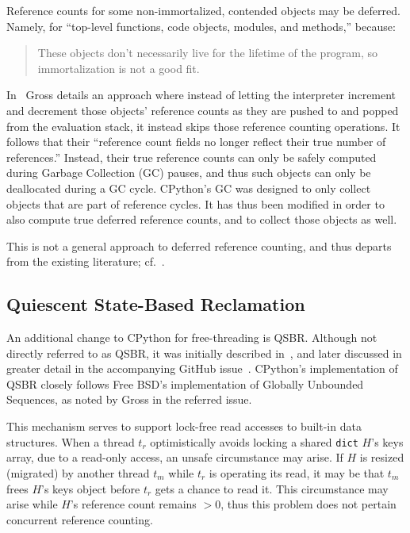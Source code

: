 Reference counts for some non-immortalized, contended objects may be deferred.
Namely, for ``top-level functions, code objects, modules, and methods,'' because:
\begin{quote}
    These objects don't necessarily live for the lifetime of the program, so immortalization is not a good fit.
\end{quote}

In~\cite[\S Deferred Reference Counting]{pep703} Gross details an approach where instead of letting the interpreter increment and decrement those objects' reference counts as they are pushed to and popped from the evaluation stack, it instead skips those reference counting operations.
It follows that their ``reference count fields no longer reflect their true number of references.''
Instead, their true reference counts can only be safely computed during Garbage Collection (GC) pauses, and thus such objects can only be deallocated during a GC cycle.
CPython's GC was designed to only collect objects that are part of reference cycles.
It has thus been modified in order to also compute true deferred reference counts, and to collect those objects as well.

This is not a general approach to deferred reference counting, and thus departs from the existing literature; cf.~\cite{deferred-refcounting}.


\subsection{Quiescent State-Based Reclamation}\label{subsec:qsbr}

An additional change to CPython for free-threading is QSBR\@.
Although not directly referred to as QSBR, it was initially described in~\cite[\S Mimalloc Page Reuse]{pep703}, and later discussed in greater detail in the accompanying GitHub issue~\cite{qsbr}.
CPython's implementation of QSBR closely follows Free BSD's implementation of Globally Unbounded Sequences, as noted by Gross in the referred issue.

This mechanism serves to support lock-free read accesses to built-in data structures.
When a thread $t_r$ optimistically avoids locking a shared \texttt{dict} $H$'s keys array, due to a read-only access, an unsafe circumstance may arise.
If $H$ is resized (migrated) by another thread $t_m$ while $t_r$ is operating its read, it may be that $t_m$ frees $H$'s keys object before $t_r$ gets a chance to read it.
This circumstance may arise while $H$'s reference count remains $> 0$, thus this problem does not pertain concurrent reference counting.

